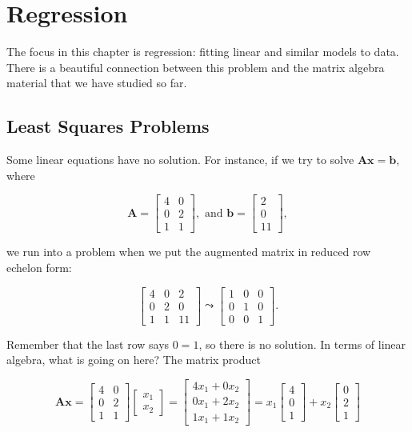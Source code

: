 \documentclass[
]{book}
\theoremstyle{definition}
\theoremstyle{definition}
\theoremstyle{definition}
\theoremstyle{definition}
\theoremstyle{remark}
\begin{document}
\chapter{Regression}\label{regression}

The focus in this chapter is regression: fitting linear and similar models to data. There is a beautiful connection between this problem and the matrix algebra material that we have studied so far.

\section{Least Squares Problems}\label{LSQP}

Some linear equations have no solution. For instance, if we try to solve \(\mathbf{A}\mathbf{x}=\mathbf{b}\), where

\[\mathbf{A}=\begin{bmatrix}4 & 0\\0 & 2\\ 1& 1\end{bmatrix}, \text{ and } \mathbf{b}=\begin{bmatrix}2\\0\\11\end{bmatrix},\]

we run into a problem when we put the augmented matrix in reduced row echelon form:

\[\left[\begin{array}{cc|c}4 & 0 & 2\\0 & 2 & 0\\1 & 1 & 11\end{array}\right]\leadsto \left[\begin{array}{cc|c} 1 & 0 & 0\\0 & 1 & 0\\0 & 0 & 1\end{array}\right].\]

Remember that the last row says \(0=1\), so there is no solution. In terms of linear algebra, what is going on here? The matrix product

\[\mathbf{A}\mathbf{x}=\begin{bmatrix}4 & 0\\0 & 2\\ 1& 1\end{bmatrix}\begin{bmatrix}x_1\\x_2\end{bmatrix}=\begin{bmatrix}4x_1+0x_2\\0x_1+2x_2\\1x_1+1x_2\end{bmatrix}=x_1\begin{bmatrix}4\\0\\1\end{bmatrix}+x_2\begin{bmatrix}0\\2\\1\end{bmatrix}\]
\end{document}
